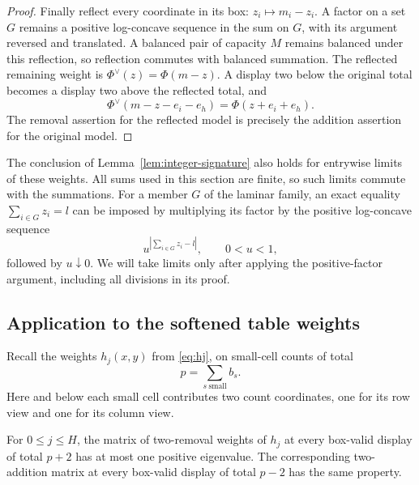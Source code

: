 \begin{proof}
Finally reflect every coordinate in its box:
\(z_i\mapsto m_i-z_i\).
A factor on a set \(G\) remains a positive log-concave sequence
in the sum on \(G\), with its argument reversed and translated.
A balanced pair of capacity \(M\) remains balanced under this
reflection, so reflection commutes with balanced summation.
The reflected remaining weight is
\(\Phi^\vee(z)=\Phi(m-z)\).
A display two below the original total becomes a display two above
the reflected total, and
\[
 \Phi^\vee(m-z-e_i-e_h)=\Phi(z+e_i+e_h).
\]
The removal assertion for the reflected model is precisely the
addition assertion for the original model.
\end{proof}

The conclusion of Lemma~\ref{lem:integer-signature} also holds for
entrywise limits of these weights.
All sums used in this section are finite, so such limits commute
with the summations.
For a member $G$ of the laminar family, an exact equality
\(\sum_{i\in G}z_i=l\) can be imposed by multiplying its factor by
the positive log-concave sequence
\[
 u^{|\sum_{i\in G}z_i-l|},
 \qquad 0<u<1,
\]
followed by \(u\downarrow0\).
We will take limits only after applying the positive-factor argument,
including all divisions in its proof.

\subsection{Application to the softened table weights}

Recall the weights \(h_j(x,y)\) from \eqref{eq:hj}, on small-cell
counts of total
\[
 p=\sum_{s\ \mathrm{small}}b_s.
\]
Here and below each small cell contributes two count coordinates,
one for its row view and one for its column view.

\begin{corollary}
\label{cor:hj-signatures}
For \(0\le j\le H\), the matrix of two-removal weights of \(h_j\)
at every box-valid display of total \(p+2\) has at most one positive
eigenvalue.
The corresponding two-addition matrix at every box-valid display
of total \(p-2\) has the same property.
\end{corollary}

